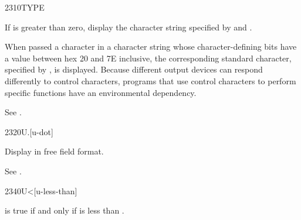 \begin{worddef}{2310}{TYPE}
\item {}

	If  is greater than zero, display the character string
	specified by  and .

	When passed a character in a character string whose
	character-defining bits have a value between hex 20 and 7E
	inclusive, the corresponding standard character, specified
	by , is displayed.
	Because different output devices can respond differently to
	control characters, programs that use control characters to
	perform specific functions have an environmental dependency.


	\begin{testing} %
		See .
	\end{testing}
\end{worddef}


\begin{worddef}[Ud]{2320}{U.{}}[u-dot]
\item {}

	Display  in free field format.

	\begin{testing} %
		See .
	\end{testing}
\end{worddef}


\begin{worddef}[Uless]{2340}{U<}[u-less-than]
\item {}

	 is true if and only if  is less than
	.


	\begin{testing} %
		 \\
		 \\
		 \\
		 \\
		 \\
		 \\
		 \\
		 \\
		 \\
		 \\
		 \\
	\end{testing}
\end{worddef}

